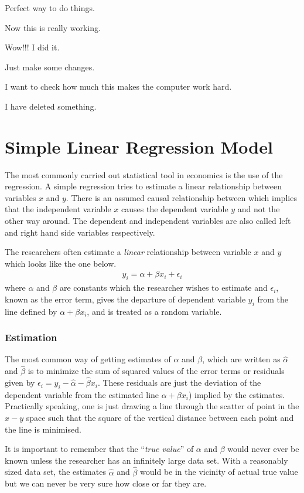\documentclass[12pt,onesided]{article}
\begin{document}
Perfect way to do things.

Now this is really working.

Wow!!! I did it.

Just make some changes.

I want to check how much this makes the computer work hard.

I have deleted something. 

\section{Simple Linear Regression Model}

The most commonly carried out statistical tool in economics is the use of the regression. A simple regression tries to estimate a
linear relationship between variables $x$ and $y$. There is an
assumed causal relationship between which implies that the
independent variable $x$ causes the dependent variable $y$ and not
the other way around. The dependent and independent variables are
also called left and right hand side variables respectively.

The researchers often estimate a \emph{linear} relationship between
variable $x$ and $y$ which looks like the one below.
\begin{align*}
    y_i= \alpha + \beta x_i + \epsilon_i
\end{align*}
where $\alpha$ and $\beta$ are constants which the researcher wishes
to estimate and $\epsilon_i$, known as the error term, gives the
departure of dependent variable $y_i$ from the line defined by
$\alpha + \beta x_i$, and is treated as a random variable.

\subsubsection*{Estimation}

The most common way of getting estimates of $\alpha$ and $\beta$, which are written as $\hat{\alpha}$ and $\hat{\beta}$ is to minimize the sum of squared values of the error terms or residuals given by $\epsilon_i=y_i-\hat{\alpha}-\hat{\beta}x_i$. These residuals are just the deviation of the dependent variable from the estimated line $\alpha + \beta x_i$) implied by the estimates. Practically speaking, one is just drawing a line through the scatter of point in the $x-y$ space such that the square of the vertical distance between each point and the line is minimised.

It is important to remember that the ``\emph{true value}'' of
$\alpha$ and $\beta$ would never ever be known unless the researcher
has an infinitely large data set. With a reasonably sized data set,
the estimates $\hat{\alpha}$ and $\hat{\beta}$ would be in the
vicinity of actual true value but we can never be very sure how
close or far they are.
\end{document}
